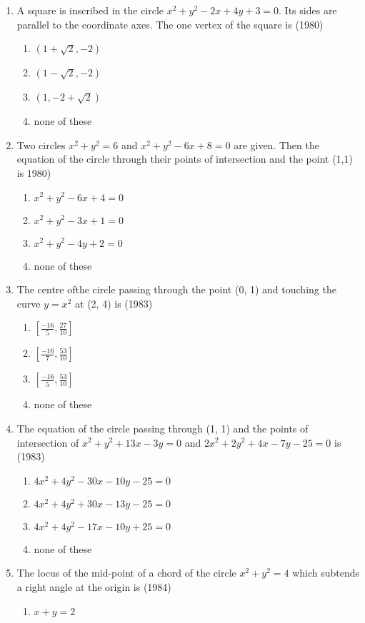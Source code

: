 \documentclass[12pt]{article}
\providecommand{\sbrak}[1]{\ensuremath{{}\left[#1\right]}}
\begin{document}
\begin{enumerate}
\item A square is inscribed in the circle $x^2+y^2-2x+4y+3 =0$. Its sides are parallel to the coordinate axes. The one vertex of the square is (1980)
\begin{enumerate}
\item $(1+\sqrt{2},-2)$
\item $(1-\sqrt{2},-2)$
\item $(1,-2+\sqrt{2})$
\item none of these
\end{enumerate}
\item Two circles $x^2+y^2=6$ and $x^2+y^2-6x+8=0$ are given. Then the equation of the circle through their points of intersection and the point (1,1) is 1980)
\begin{enumerate}
\item $x^2+y^2-6x+4=0$
\item $x^2+y^2-3x+1=0$
\item $x^2+y^2-4y+2=0$
\item none of these
\end{enumerate}
\item The centre ofthe circle passing through the point (0, 1) and touching the curve $y =x^2$ at (2, 4) is (1983)
\begin{enumerate}
\item $\sbrak{\frac{-16}{5},\frac{27}{10}}$
\item $\sbrak{\frac{-16}{7},\frac{53}{10}}$
\item $\sbrak{\frac{-16}{5},\frac{53}{10}}$
\item none of these
\end{enumerate}
\item The equation of the circle passing through (1, 1) and the points of intersection of $x^2+y^2+13x-3y=0$ and $2x^2+2y^2+4x-7y-25=0$ is (1983)
\begin{enumerate}
\item $4x^2+4y^2-30x-10y-25=0$
\item $4x^2+4y^2+30x-13y-25=0$
\item $4x^2+4y^2-17x-10y+25=0$
\item none of these
\end{enumerate}
\item The locus of the mid-point of a chord of the circle $x^2+y^2=4$ which subtends a right angle at the origin is (1984)
\begin{enumerate}
\item $x+y=2$

\end{enumerate}
\end{enumerate}
\end{document}
